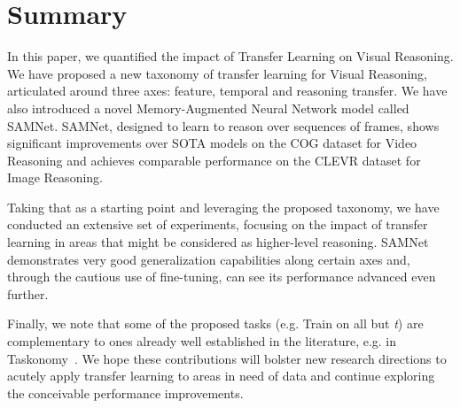 \section{Summary}


In this paper, we quantified the impact of Transfer Learning on Visual Reasoning.
We have proposed a new taxonomy of transfer learning for Visual Reasoning, articulated around three axes: feature, temporal and reasoning transfer.
We have also introduced a novel Memory-Augmented Neural Network model called SAMNet.
SAMNet, designed to learn to reason over sequences of frames, shows significant improvements over SOTA models on the COG dataset for Video Reasoning  and achieves comparable performance on the CLEVR dataset for Image Reasoning.

Taking that as a starting point and leveraging the proposed taxonomy, we have conducted an extensive set of experiments, focusing on the impact of transfer learning in areas that might be considered as higher-level reasoning.
SAMNet demonstrates very good generalization capabilities along certain axes and, through the cautious use of fine-tuning, can see its performance advanced even further.

Finally, we note that some of the proposed tasks (e.g. Train on all but \textit{t}) are complementary to ones already well established in the literature, e.g. in Taskonomy~\cite{zamir2018taskonomy}.
We hope these contributions will bolster new research directions to acutely apply transfer learning to areas in need of data and continue exploring the conceivable performance improvements.

